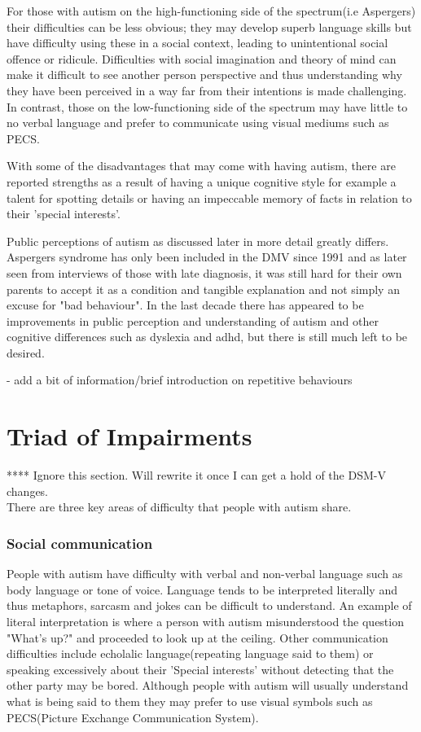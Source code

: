\documentclass[11pt]{report}
\begin{document}
For those with autism on the high-functioning side of the spectrum(i.e Aspergers) their difficulties can be less obvious; they may develop superb language skills but have difficulty using these in a social context, leading to unintentional social offence or ridicule. Difficulties with social imagination and theory of mind can make it difficult to see another person perspective and thus understanding why they have been perceived in a way far from their intentions is made challenging. In contrast, those on the low-functioning side of the spectrum may have little to no verbal language and prefer to communicate using visual mediums such as PECS. 

With some of the disadvantages that may come with having autism, there are reported strengths as a result of having a unique cognitive style for example a talent for spotting details\cite{bayes} or having an impeccable memory of facts in relation to their 'special interests'. 

Public perceptions of autism as discussed later in more detail greatly differs. Aspergers syndrome has only been included in the DMV since 1991 and as later seen from interviews of those with late diagnosis, it was still hard for their own parents to accept it as a condition and tangible explanation and not simply an excuse for "bad behaviour". In the last decade there has appeared to be improvements in public perception and understanding of autism and other cognitive differences such as dyslexia and adhd, but there is still much left to be desired. 

- add a bit of information/brief introduction on repetitive behaviours


\section{Triad of Impairments}

**** Ignore this section. Will rewrite it once I can get a hold of the DSM-V changes. \\

There are three key areas of difficulty that people with autism share.

\subsubsection*{Social communication}
People with autism have difficulty with verbal and non-verbal language such as body language or tone of voice. Language tends to be interpreted literally and thus metaphors, sarcasm and jokes can be difficult to understand\cite{nas}. An example of literal interpretation is where a person with autism misunderstood the question "What's up?" and proceeded to look up at the ceiling. Other communication difficulties include echolalic language(repeating language said to them) or speaking excessively about their 'Special interests' without detecting that the other party may be bored\cite{nas}. Although people with autism will usually understand what is being said to them they may prefer to use visual symbols such as PECS(Picture Exchange Communication System). 
\end{document}
